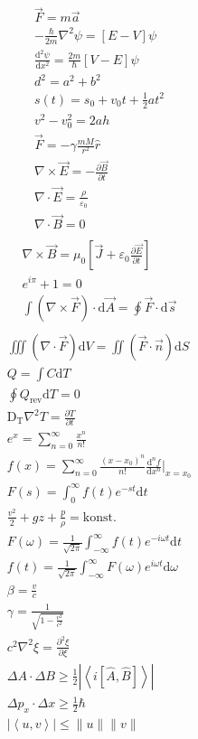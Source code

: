 \documentclass{article}
\begin{document}
\begin{eqnarray*}
\vec{F} = m\vec{a} \\
-\frac{\hbar}{2m}\nabla^2 \psi = \left[E - V\right]\psi \\
\frac{\mathrm{d}^2\psi}{\mathrm{d}x^2} = \frac{2m}{\hbar}\left[V - E\right]\psi \\
d^2 = a^2 + b^2 \\
s(t) = s_0 + v_0t + \frac{1}{2}at^2 \\
v^2 - v_0^2 = 2ah \\
\vec{F} = -\gamma\frac{mM}{r^2}\hat{r} \\
\nabla\times\vec{E} = -\frac{\partial\vec{B}}{\partial t} \\
\nabla \cdot \vec{E} = \frac{\rho}{\varepsilon_0} \\
\nabla \cdot \vec{B} = 0 \\
\end{eqnarray*}
\begin{eqnarray*}
\nabla\times\vec{B} = \mu_0\left[\vec{J} + \varepsilon_0\frac{\partial\vec{E}}{\partial t}\right] \\
e^{i\pi} + 1 = 0 \\
\int (\nabla \times \vec{F}) \cdot \mathrm{d} \vec{A} = \oint \vec{F} \cdot \mathrm{d} \vec{s} \\
\end{eqnarray*}
\begin{eqnarray*}
\iiint (\nabla\cdot\vec{F})\mathrm{d} V = \iint (\vec{F}\cdot\vec{n})\mathrm{d} S \\
Q = \int C\mathrm{d}T \\
\oint Q_{\text{rev}}\mathrm{d}T = 0 \\
\text{D}_{\text{T}}\nabla^2T = \frac{\partial T}{\partial t} \\
e^x = \sum_{n = 0}^\infty\frac{x^n}{n!} \\
f(x) = \sum_{n = 0}^\infty\frac{(x - x_0)^n}{n!}\frac{\mathrm{d}^nf}{\mathrm{d}x^n}\bigg|_{x = x_0} \\
F(s) = \int_0^\infty f(t)e^{-st}\mathrm{d}t \\
\frac{v^2}{2} + gz + \frac{p}{\rho} = \text{konst.} \\
F(\omega) = \frac{1}{\sqrt{2\pi}}\int_{-\infty}^\infty f(t)e^{-i\omega t}\mathrm{d}t \\
f(t) = \frac{1}{\sqrt{2\pi}}\int_{-\infty}^\infty F(\omega)e^{i\omega t}\mathrm{d}\omega \\
\beta = \frac{v}{c} \\
\gamma = \frac{1}{\sqrt{1 - \frac{v^2}{c^2}}} \\
c^2\nabla^2\xi = \frac{\partial^2\xi}{\partial\xi} \\
\Delta A\cdot\Delta B\geq\frac{1}{2}\left|\left\langle i\left[\hat{A}, \hat{B}\right]\right\rangle\right| \\
\Delta p_x\cdot\Delta x\geq\frac{1}{2}\hbar \\
\left|\left\langle u, v \right\rangle\right|\leq\| u \|\| v \| \\
\end{eqnarray*}
\end{document}

